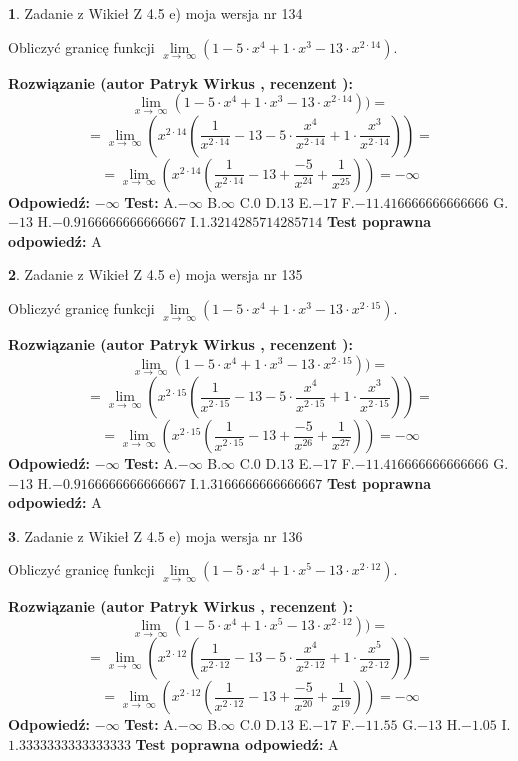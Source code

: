 \documentclass[12pt, a4paper]{article}
\theoremstyle{definition} %
\newtheorem{zad}{}
\newcommand{\zadStart}[1]{\begin{zad}#1\newline}
\newcommand{\zadStop}{\end{zad}}
\newcommand{\rozwStart}[2]{\noindent \textbf{Rozwiązanie (autor #1 , recenzent #2): }\newline}
\newcommand{\rozwStop}{\newline}
\newcommand{\odpStart}{\noindent \textbf{Odpowiedź:}\newline}
\newcommand{\odpStop}{\newline}
\newcommand{\testStart}{\noindent \textbf{Test:}\newline}
\newcommand{\testStop}{\newline}
\newcommand{\kluczStart}{\noindent \textbf{Test poprawna odpowiedź:}\newline}
\newcommand{\kluczStop}{\newline}
\begin{document}
\zadStart{Zadanie z Wikieł Z 4.5 e) moja wersja nr 134}


Obliczyć granicę funkcji  $\lim\limits_{x\to\ \infty}(1 - 5 \cdot x^{4}+1 \cdot x^{3}- 13 \cdot x^{2\cdot14})$.
\zadStop
\rozwStart{Patryk Wirkus}{}
$$\lim\limits_{x\to\ \infty}(1 - 5 \cdot x^{4}+1 \cdot x^{3}- 13 \cdot x^{2\cdot14}))=$$
$$=\lim\limits_{x\to\ \infty}(x^{2\cdot14}(\frac{1}{x^{2\cdot14}}-13 -5 \cdot \frac{x^{4}}{x^{2\cdot14}}+1 \cdot \frac{x^{3}}{x^{2\cdot14}}))=$$
$$=\lim\limits_{x\to\ \infty}(x^{2\cdot14}(\frac{1}{x^{2\cdot14}}-13 + \frac{-5}{x^{24}}+ \frac{1}{x^{25}}))=-\infty$$
\rozwStop
\odpStart
$-\infty$
\odpStop
\testStart
A.$-\infty$ B.$\infty$ C.$0$ D.$13$ E.$-17$
F.$-11.416666666666666$ G.$-13$
H.$-0.9166666666666667$
I.$1.3214285714285714$
\testStop
\kluczStart
A
\kluczStop



\zadStart{Zadanie z Wikieł Z 4.5 e) moja wersja nr 135}


Obliczyć granicę funkcji  $\lim\limits_{x\to\ \infty}(1 - 5 \cdot x^{4}+1 \cdot x^{3}- 13 \cdot x^{2\cdot15})$.
\zadStop
\rozwStart{Patryk Wirkus}{}
$$\lim\limits_{x\to\ \infty}(1 - 5 \cdot x^{4}+1 \cdot x^{3}- 13 \cdot x^{2\cdot15}))=$$
$$=\lim\limits_{x\to\ \infty}(x^{2\cdot15}(\frac{1}{x^{2\cdot15}}-13 -5 \cdot \frac{x^{4}}{x^{2\cdot15}}+1 \cdot \frac{x^{3}}{x^{2\cdot15}}))=$$
$$=\lim\limits_{x\to\ \infty}(x^{2\cdot15}(\frac{1}{x^{2\cdot15}}-13 + \frac{-5}{x^{26}}+ \frac{1}{x^{27}}))=-\infty$$
\rozwStop
\odpStart
$-\infty$
\odpStop
\testStart
A.$-\infty$ B.$\infty$ C.$0$ D.$13$ E.$-17$
F.$-11.416666666666666$ G.$-13$
H.$-0.9166666666666667$
I.$1.3166666666666667$
\testStop
\kluczStart
A
\kluczStop



\zadStart{Zadanie z Wikieł Z 4.5 e) moja wersja nr 136}


Obliczyć granicę funkcji  $\lim\limits_{x\to\ \infty}(1 - 5 \cdot x^{4}+1 \cdot x^{5}- 13 \cdot x^{2\cdot12})$.
\zadStop
\rozwStart{Patryk Wirkus}{}
$$\lim\limits_{x\to\ \infty}(1 - 5 \cdot x^{4}+1 \cdot x^{5}- 13 \cdot x^{2\cdot12}))=$$
$$=\lim\limits_{x\to\ \infty}(x^{2\cdot12}(\frac{1}{x^{2\cdot12}}-13 -5 \cdot \frac{x^{4}}{x^{2\cdot12}}+1 \cdot \frac{x^{5}}{x^{2\cdot12}}))=$$
$$=\lim\limits_{x\to\ \infty}(x^{2\cdot12}(\frac{1}{x^{2\cdot12}}-13 + \frac{-5}{x^{20}}+ \frac{1}{x^{19}}))=-\infty$$
\rozwStop
\odpStart
$-\infty$
\odpStop
\testStart
A.$-\infty$ B.$\infty$ C.$0$ D.$13$ E.$-17$
F.$-11.55$ G.$-13$
H.$-1.05$
I.$1.3333333333333333$
\testStop
\kluczStart
A
\kluczStop
\end{document}
